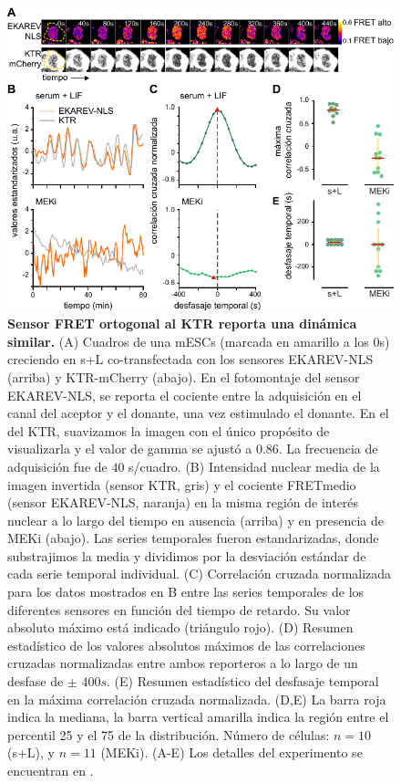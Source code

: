 \documentclass[./main.tex]{subfiles}
\begin{document}
\begin{figure}
    \centering
    \includegraphics[width=1\columnwidth]{figures/chapter2/C2_FRET.pdf} 
    \caption{\textbf{Sensor FRET ortogonal al KTR reporta una dinámica similar.} (A) Cuadros de una mESCs (marcada en amarillo a los 0s) creciendo en s+L co-transfectada con los sensores EKAREV-NLS (arriba) y KTR-mCherry (abajo). En el fotomontaje del sensor EKAREV-NLS, se reporta el cociente entre la adquisición en el canal del aceptor y el donante, una vez estimulado el donante. En el del KTR, suavizamos la imagen con el único propósito de visualizarla y el valor de gamma se ajustó a $0.86$. La frecuencia de adquisición fue de $40$ s/cuadro. (B) Intensidad nuclear media de la imagen invertida (sensor KTR, gris) y el cociente FRETmedio (sensor EKAREV-NLS, naranja) en la misma región de interés nuclear a lo largo del tiempo en ausencia (arriba) y en presencia de MEKi (abajo). Las series temporales fueron estandarizadas, donde substrajimos la media y dividimos por la desviación estándar de cada serie temporal individual. (C) Correlación cruzada normalizada para los datos mostrados en B entre las series temporales de los diferentes sensores en función del tiempo de retardo. Su valor absoluto máximo está indicado (triángulo rojo). (D) Resumen estadístico de los valores absolutos máximos de las correlaciones cruzadas normalizadas entre ambos reporteros a lo largo de un desfase de $\pm$ $400 s$. (E) Resumen estadístico del desfasaje temporal en la máxima correlación cruzada normalizada. (D,E) La barra roja indica la mediana, la barra vertical amarilla indica la región entre el percentil 25 y el 75 de la distribución. Número de células: $n = 10$ (s+L), y $n = 11$ (MEKi). (A-E) Los detalles del experimento se encuentran en \cite{Fabris2022}.}
    \label{C2_fig:FRET}
\end{figure}
\end{document}
